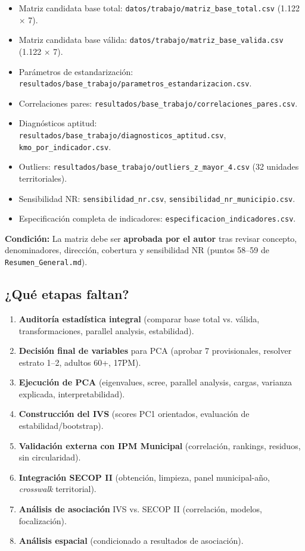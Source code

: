 \begin{itemize}
    \item Matriz candidata base total: \texttt{datos/trabajo/matriz\_base\_total.csv} (1.122 $\times$ 7).
    \item Matriz candidata base válida: \texttt{datos/trabajo/matriz\_base\_valida.csv} (1.122 $\times$ 7).
    \item Parámetros de estandarización: \texttt{resultados/base\_trabajo/parametros\_estandarizacion.csv}.
    \item Correlaciones pares: \texttt{resultados/base\_trabajo/correlaciones\_pares.csv}.
    \item Diagnósticos aptitud: \texttt{resultados/base\_trabajo/diagnosticos\_aptitud.csv}, \texttt{kmo\_por\_indicador.csv}.
    \item Outliers: \texttt{resultados/base\_trabajo/outliers\_z\_mayor\_4.csv} (32 unidades territoriales).
    \item Sensibilidad NR: \texttt{sensibilidad\_nr.csv}, \texttt{sensibilidad\_nr\_municipio.csv}.
    \item Especificación completa de indicadores: \texttt{especificacion\_indicadores.csv}.
\end{itemize}

\textbf{Condición:} La matriz debe ser \textbf{aprobada por el autor} tras revisar concepto, denominadores, dirección, cobertura y sensibilidad NR (puntos 58--59 de \texttt{Resumen\_General.md}).

\subsection{¿Qué etapas faltan?}

\begin{enumerate}
    \item \textbf{Auditoría estadística integral} (comparar base total vs. válida, transformaciones, parallel analysis, estabilidad).
    \item \textbf{Decisión final de variables} para PCA (aprobar 7 provisionales, resolver estrato 1--2, adultos 60+, 17PM).
    \item \textbf{Ejecución de PCA} (eigenvalues, scree, parallel analysis, cargas, varianza explicada, interpretabilidad).
    \item \textbf{Construcción del IVS} (scores PC1 orientados, evaluación de estabilidad/bootstrap).
    \item \textbf{Validación externa con IPM Municipal} (correlación, rankings, residuos, sin circularidad).
    \item \textbf{Integración SECOP II} (obtención, limpieza, panel municipal-año, \textit{crosswalk} territorial).
    \item \textbf{Análisis de asociación} IVS vs. SECOP II (correlación, modelos, focalización).
    \item \textbf{Análisis espacial} (condicionado a resultados de asociación).
\end{enumerate}

